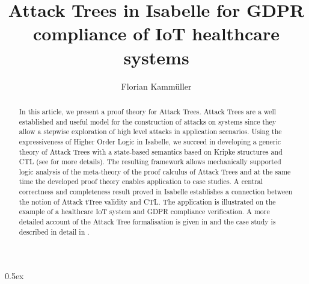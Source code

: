 \documentclass[11pt,a4paper]{article}
\begin{document}
\title{Attack Trees in Isabelle for GDPR compliance of IoT healthcare systems}
\author{Florian Kamm\"uller}

\maketitle

\begin{abstract}
In this article, we present a proof theory for Attack Trees. Attack Trees are a well established and 
useful model for the construction of attacks on systems since they allow a stepwise exploration of 
high level attacks in application scenarios. Using the expressiveness of Higher Order Logic in Isabelle, 
we succeed in developing a generic theory of Attack Trees with a state-based semantics based on Kripke 
structures and CTL (see \cite{kam:16b} for more details). 
The resulting framework allows mechanically supported logic analysis of the meta-theory 
of the proof calculus of Attack Trees and at the same time the developed proof theory enables application 
to case studies. 
A central correctness and completeness result proved in Isabelle establishes a connection 
between the notion of Attack tTree validity and CTL. 
The application is illustrated on the example of a healthcare IoT system and GDPR compliance verification.
A more detailed account of the Attack Tree formalisation is given in \cite{kam:18b} and the case study 
is described in detail in \cite{kam:18a}.
\end{abstract}
\tableofcontents

\parindent 0pt\parskip 0.5ex





\end{document}
